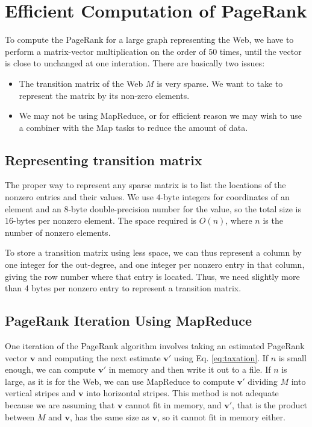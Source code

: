\section{Efficient Computation of PageRank}\label{sec:efficient-computation-pagerank}

To compute the PageRank for a large graph representing the Web, we have to perform a matrix-vector multiplication on the order of $50$ times, until the vector is close to unchanged at one interation. There are basically two issues:
\begin{itemize}
    \item The transition matrix of the Web $M$ is very sparse. We want to take to represent the matrix by its non-zero elements.
    \item We may not be using MapReduce, or for efficient reason we may wish to use a combiner with the Map tasks to reduce the amount of data.
\end{itemize}

\subsection{Representing transition matrix}\label{subsec:representing-transition-matrix}

The proper way to represent any sparse matrix is to list the locations of the nonzero entries and their values. We use $4$-byte integers for coordinates of an element and an $8$-byte double-precision number for the value, so the total size is $16$-bytes per nonzero element. The space required is $O(n)$, where $n$ is the number of nonzero elements.

To store a transition matrix using less space, we can thus represent a column by one integer for the out-degree, and one integer per nonzero entry in that column, giving the row number where that entry is located. Thus, we need slightly more than 4 bytes per nonzero entry to represent a transition matrix.

\subsection{PageRank Iteration Using MapReduce}\label{subsec:pagerank-iteration-mapreduce}

One iteration of the PageRank algorithm involves taking an estimated PageRank vector $\textbf{v}$ and computing the next estimate $\textbf{v}'$ using Eq. \ref{eq:taxation}. 
If $n$ is small enough, we can compute $\textbf{v}'$ in memory and then write it out to a file. If $n$ is large, as it is for the Web, we can use MapReduce to compute $\textbf{v}'$ dividing $M$ into vertical stripes and $\textbf{v}$ into horizontal stripes. This method is not adequate because we are assuming that $\textbf{v}$ cannot fit in memory, and $\textbf{v}'$, that is the product between $M$ and $\textbf{v}$, has the same size as $\textbf{v}$, so it cannot fit in memory either.

